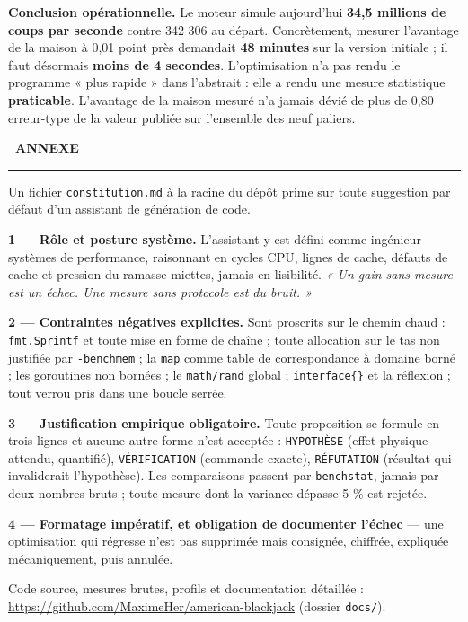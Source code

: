 \documentclass[10pt,a4paper]{article}
\newcommand{\partbanner}[2]{%
  \vspace{2pt}
  \noindent\colorbox{accent}{\color{white}\footnotesize\bfseries\ #1\ }%
  \hspace{6pt}{\color{ink}\bfseries\large #2}\\[-3pt]
  {\color{rulegray}\rule{\textwidth}{0.9pt}}\vspace{-1pt}
}
\newenvironment{keybox}
  {\begin{lrbox}{\keyboxbuf}%
   \begin{minipage}{\dimexpr\textwidth-16pt}\small\color{ink}\setlength{\parskip}{3pt}}
  {\end{minipage}\end{lrbox}%
   \setlength{\fboxsep}{8pt}\noindent\colorbox{accentlight}{\usebox{\keyboxbuf}}}
\newcommand{\code}[1]{\texttt{\small #1}}
\begin{document}
\vspace{5pt}
\begin{keybox}
\textbf{Conclusion opérationnelle.} Le moteur simule aujourd'hui \textbf{34,5 millions de
coups par seconde} contre 342 306 au départ. Concrètement, mesurer l'avantage de la
maison à 0,01 point près demandait \textbf{48 minutes} sur la version initiale ; il faut
désormais \textbf{moins de 4 secondes}. L'optimisation n'a pas rendu le programme « plus
rapide » dans l'abstrait : elle a rendu une mesure statistique \textbf{praticable}.
L'avantage de la maison mesuré n'a jamais dévié de plus de 0,80 erreur-type de la valeur
publiée sur l'ensemble des neuf paliers.
\end{keybox}

\vspace{8pt}
\partbanner{ANNEXE}{Gouvernance technique IA — \texttt{constitution.md}}

Un fichier \code{constitution.md} à la racine du dépôt prime sur toute suggestion par
défaut d'un assistant de génération de code.

\textbf{1 — Rôle et posture système.} L'assistant y est défini comme ingénieur systèmes de
performance, raisonnant en cycles CPU, lignes de cache, défauts de cache et pression du
ramasse-miettes, jamais en lisibilité. \emph{« Un gain sans mesure est un échec. Une
mesure sans protocole est du bruit. »}

\textbf{2 — Contraintes négatives explicites.} Sont proscrits sur le chemin chaud :
\code{fmt.Sprintf} et toute mise en forme de chaîne ; toute allocation sur le tas non
justifiée par \code{-benchmem} ; la \code{map} comme table de correspondance à domaine
borné ; les goroutines non bornées ; le \code{math/rand} global ; \code{interface\{\}} et
la réflexion ; tout verrou pris dans une boucle serrée.

\textbf{3 — Justification empirique obligatoire.} Toute proposition se formule en trois
lignes et aucune autre forme n'est acceptée : \code{HYPOTHÈSE} (effet physique attendu,
quantifié), \code{VÉRIFICATION} (commande exacte), \code{RÉFUTATION} (résultat qui
invaliderait l'hypothèse). Les comparaisons passent par \code{benchstat}, jamais par deux
nombres bruts ; toute mesure dont la variance dépasse 5 \% est rejetée.

\textbf{4 — Formatage impératif, et obligation de documenter l'échec} — une optimisation
qui régresse n'est pas supprimée mais consignée, chiffrée, expliquée mécaniquement, puis
annulée.

\vspace{5pt}
{\footnotesize\color{muted}Code source, mesures brutes, profils et documentation détaillée :
\url{https://github.com/MaximeHer/american-blackjack} (dossier \code{docs/}).}
\end{document}
